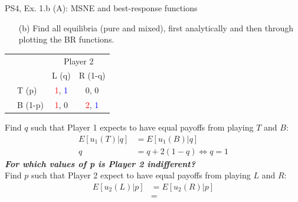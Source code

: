 \begin{frame}{PS4, Ex. 1.b (A): MSNE and best-response functions}
  \begin{multicols}{2}
    \begin{itemize}
      \item[(b)] Find all equilibria (pure and mixed), first analytically and then through plotting the BR functions.
    \end{itemize}
    \begin{table}
      \begin{tabular}{cl|c|c|}
        & \multicolumn{1}{c}{} & \multicolumn{2}{c}{\color{blue}Player 2}\\
        \parbox[t]{1mm}{}
        &  &  &  \\
        & T (p) & \textcolor{red}{1}, \textcolor{blue}{1} & 0, 0 \\
        & B (1-p) & \textcolor{red}{1}, 0 & \textcolor{red}{2}, \textcolor{blue}{1} \\
      \end{tabular}
    \end{table}
    Find $q$ such that Player 1 expects to have equal payoffs from playing $T$ and $B$:
    \begin{align*}
      E[u_1(T)|q]&=E[u_1(B)|q]\\
      q &= q + 2(1-q) \Leftrightarrow q = 1
    \end{align*}
    \textbf{\textit{For which values of p is Player 2 indifferent?}}\\\medskip
    Find $p$ such that Player 2 expect to have equal payoffs from playing $L$ and $R$:
    \begin{align*}
      E[u_2(L)|p]&=E[u_2(R)|p]\\
       &=
    \end{align*}
  \vfill\null \columnbreak
  \vfill\null
  \end{multicols}
\end{frame}
